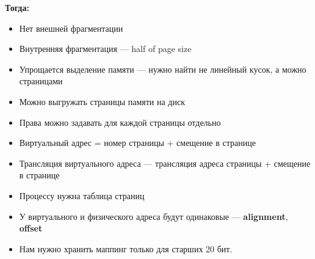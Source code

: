 \documentclass[../../lectures.tex]{subfiles}
\begin{document}
\textbf{Тогда:}
\begin{itemize}
    \item Нет внешней фрагментации
    \item Внутренняя фрагментация --- half of page size
    \item Упрощается выделение памяти --- нужно найти не линейный кусок, а можно страницами
    \item Можно выгружать страницы памяти на диск
    \item Права можно задавать для каждой страницы отдельно
    \item Виртуальный адрес = номер страницы + смещение в странице
    \item Трансляция виртуального адреса --- трансляция адреса страницы + смещение в странице
    \item Процессу нужна таблица страниц
    \item У виртуального и физического адреса будут одинаковые --- \textbf{alignment}, \textbf{offset}
    \item Нам нужно хранить маппинг только для старших 20 бит.
\end{itemize}
\end{document}
